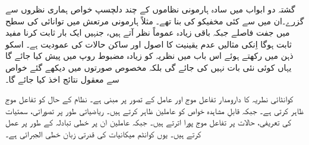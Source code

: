 
	گشتہ دو ابواب میں سادہ ہارمونی نظاموں کے چند دلچسپ خواص ہماری نظروں سے گزرے۔ان میں سے کئی مخفیکو کی بنا تھے۔ مثلاً ہارمونی مرتعش میں توانائی کی سطح میں جفت فاصلے جبکہ باقی زیادہ عموماً نظر آتے ہیں، جنہیں ایک بار ثابت کرنا مفید ثابت ہوگا اِنکی مثالیں عدم یقینیت کا اصول اور ساکن حالات کی عمودیت ہے۔ اسکو ذہن میں رکھتے ہوئے اس باب میں نظریہ کو زیادہ مضبوط روپ میں پیش کیا جائے گا یہاں کوئی نئی بات نہیں کی جائے گی بلکہ مخصوص صورتوں میں دیکھے گئے خواص سے معقول نتائج اخذ کیا جائے گا۔
	
	کوانٹائی نطریہ کا دارومدار تفاعل موج اور عامل کے تصور پر مبنی ہے۔ نظام کے حال کو تفاعل موج ظاہر کرتی ہے۔ جبکہ قابلِ مشاہدہ خواص کو عاملین ظاہر کرتے ہیں۔ ریاضیاتی طور پر تصوراتی، سمتیات کی تعریفی، حالات پر تفاعل موج پورا اترتے ہیں۔ جبکہ عاملین ان پر خطی تبادلہ کے طور پر عمل کرتے ہیں۔ یوں کوانٹم میکانیات کی قدرتی زبان خطی الجبرائی ہے۔
	
